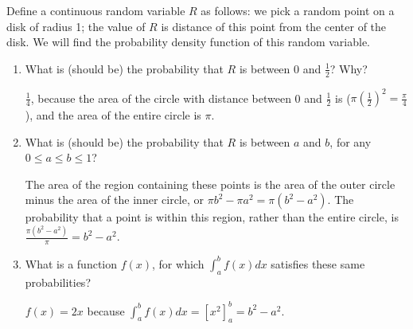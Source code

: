 \question Define a continuous random variable $R$ as follows: we pick 
a random point on a disk of radius 1; the value of $R$ is distance of 
this point from the center of the disk. We will find the probability 
density function of this random variable.

\begin{enumerate}[label=(\alph*)]
\item What is (should be) the probability that $R$ is between 0 and 
$\frac{1}{2}$? Why?
\begin{solution}[4cm]
$\frac{1}{4}$, because the area of the circle with distance between 
0 and $\frac{1}{2}$ is ($\pi(\frac{1}{2})^2 = \frac{\pi}{4}$), and 
the area of the entire circle is $\pi$.
\end{solution}

\item What is (should be) the probability that $R$ is between $a$ 
and $b$, for any $0 \le a \le b \le 1$?
\begin{solution}[4cm]
The area of the region containing these points is the area of the 
outer circle minus the area of the inner circle, or $\pi b^2 - \pi a^2 
= \pi(b^2 - a^2)$. The probability that a point is within this region, 
rather than the entire circle, is $\frac{\pi(b^2 - a^2)}{\pi} = b^2 - a^2$.
\end{solution}

\item What is a function $f(x)$, for which $\int_{a}^{b} f(x)dx$ 
satisfies these same probabilities?
\begin{solution}[4cm] $f(x) = 2x$ because $\int_{a}^{b} f(x)dx = 
[x^2]_{a}^{b} = b^2 - a^2$. \end{solution}

\end{enumerate}